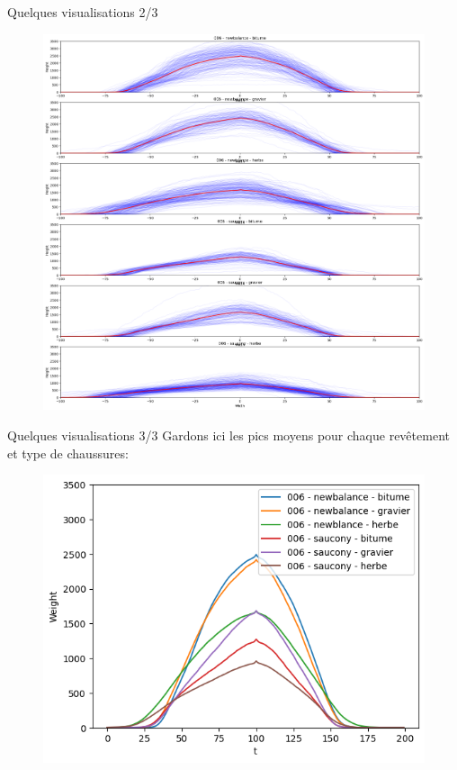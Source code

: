 \begin{frame}{Quelques visualisations 2/3}
    \begin{figure}
        \includegraphics[scale=0.2]{./figures/res_03.png}
    \end{figure}
\end{frame}
\begin{frame}{Quelques visualisations 3/3}
    Gardons ici les pics moyens pour chaque revêtement et type de chaussures:
    \begin{figure}
        \includegraphics[scale=0.5]{./figures/res_04.png}
    \end{figure}
\end{frame}
